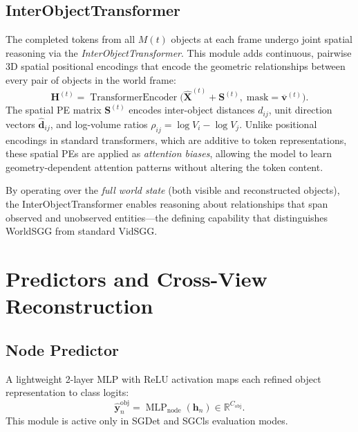 \documentclass{article}
\newcommand{\mR}{\mathbb{R}}
\newcommand{\op}[1]{\operatorname{#1}}
\newcommand{\mat}[1]{\bm{#1}}
\begin{document}
\subsection{InterObjectTransformer}

The completed tokens from all $M(t)$ objects at each frame undergo joint spatial reasoning via the \emph{InterObjectTransformer}.  This module adds continuous, pairwise 3D spatial positional encodings that encode the geometric relationships between every pair of objects in the world frame:
\begin{equation}
    \mat{H}^{(t)} = \op{TransformerEncoder}\bigl(\hat{\mat{X}}^{(t)} + \mat{S}^{(t)},\; \text{mask}=\overline{\mat{v}}^{(t)}\bigr).
    \label{eq:iot}
\end{equation}
The spatial PE matrix $\mat{S}^{(t)}$ encodes inter-object distances $d_{ij}$, unit direction vectors $\hat{\mat{d}}_{ij}$, and log-volume ratios $\rho_{ij} = \log V_i - \log V_j$.  Unlike positional encodings in standard transformers, which are additive to token representations, these spatial PEs are applied as \emph{attention biases}, allowing the model to learn geometry-dependent attention patterns without altering the token content.

By operating over the \emph{full world state} (both visible and reconstructed objects), the InterObjectTransformer enables reasoning about relationships that span observed and unobserved entities---the defining capability that distinguishes WorldSGG from standard VidSGG.

\section{Predictors and Cross-View Reconstruction}
\label{sec:predictors}

\subsection{Node Predictor}

A lightweight 2-layer MLP with ReLU activation maps each refined object representation to class logits:
\begin{equation}
    \hat{\mat{y}}_n^{\text{obj}} = \op{MLP}_{\text{node}}(\mat{h}_n) \in \mR^{C_{\text{obj}}}.
    \label{eq:node_pred}
\end{equation}
This module is active only in SGDet and SGCls evaluation modes.
\end{document}
